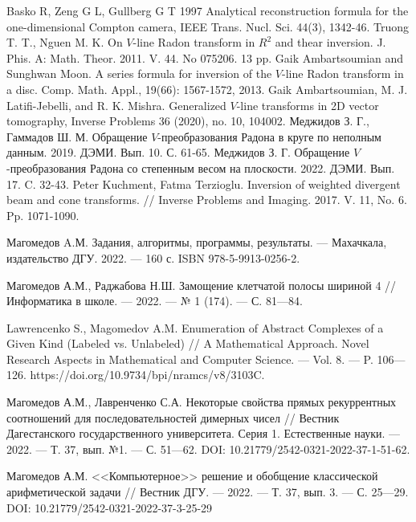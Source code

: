 \begin{thebibliography}{111}

     Basko R, Zeng G L, Gullberg G T 1997 Analytical reconstruction formula for the one-dimensional Compton camera, IEEE Trans. Nucl. Sci. 44(3), 1342-46.
     Truong T. T., Nguen M. K. On $V$-line Radon transform in $R^2$   and thear inversion. J. Phis. A: Math. Theor. 2011. V. 44. No 075206. 13 pp.
     Gaik Ambartsoumian and Sunghwan Moon. A series formula for inversion of the $V$-line Radon transform in a disc. Comp. Math. Appl., 19(66): 1567-1572, 2013.
     Gaik Ambartsoumian, M. J. Latifi-Jebelli, and R. K. Mishra. Generalized $V$-line transforms in 2D vector tomography, Inverse Problems 36 (2020), no. 10, 104002.
     Меджидов З. Г., Гаммадов Ш. М. Обращение $V$-преобразования Радона в круге по неполным данным. 2019. ДЭМИ. Вып. 10. С. 61-65.
     Меджидов З. Г. Обращение $V$-преобразования Радона со степенным весом на плоскости. 2022. ДЭМИ. Вып. 17. C. 32-43.
     Peter Kuchment, Fatma Terzioglu. Inversion of weighted divergent beam and cone transforms. // Inverse Problems and Imaging. 2017. V. 11, No. 6. Pp. 1071-1090.


Магомедов A.М.
Задания, алгоритмы, программы, результаты.
--- Махачкала, издательство ДГУ. 2022.
--- 160 с.
ISBN 978-5-9913-0256-2.

Магомедов А.М., Раджабова Н.Ш.
Замощение клетчатой полосы шириной 4
//
Информатика в школе.
--- 2022.
--- № 1 (174).
--- С. 81---84.

Lawrencenko S., Magomedov A.M.
Enumeration of Abstract Complexes of a Given Kind (Labeled vs. Unlabeled)
//
A Mathematical Approach. Novel Research Aspects in Mathematical and Computer Science.
--- Vol. 8.
--- P. 106---126.
https://doi.org/10.9734/bpi/nramcs/v8/3103C.

Магомедов А.М., Лавренченко С.А.
Некоторые свойства прямых рекуррентных соотношений для последовательностей димерных чисел
//
Вестник Дагестанского государственного университета. Серия 1. Естественные науки.
--- 2022.
--- Т. 37, вып. №1.
--- С. 51---62.
DOI: 10.21779/2542-0321-2022-37-1-51-62.

Магомедов А.М.
<<Компьютерное>> решение и обобщение классической арифметической задачи
//
Вестник ДГУ.
--- 2022.
--- Т. 37, вып. 3.
--- С. 25---29.
DOI: 10.21779/2542-0321-2022-37-3-25-29


\end{thebibliography}
